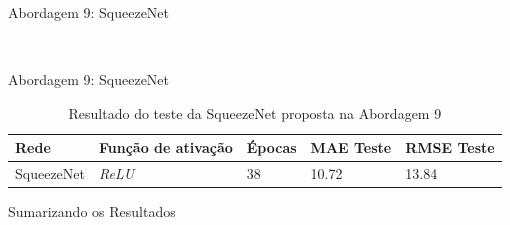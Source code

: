 \begin{frame}{\large{Abordagem 9: SqueezeNet}}
\begin{figure}[h!]
\begin{subfigure}[hb]{0.5\linewidth}
		\end{subfigure}\\
	\end{figure}
\end{frame}

\begin{frame}{\large{Abordagem 9: SqueezeNet}}
  \begin{table}[!ht]
	\centering
	\caption{Resultado do teste da SqueezeNet proposta na Abordagem 9}
	\label{tab:results-9}
		\begin{tabular}{l l l l l }
			\toprule
			Rede & Função de ativação & Épocas & MAE Teste & RMSE Teste \\
			\midrule
			SqueezeNet & \emph{ReLU} & 38 & 10.72 & 13.84 \\
			\bottomrule
		\end{tabular}
	\end{table}
\end{frame}



\begin{frame}{Sumarizando os Resultados}
  
\end{frame}
